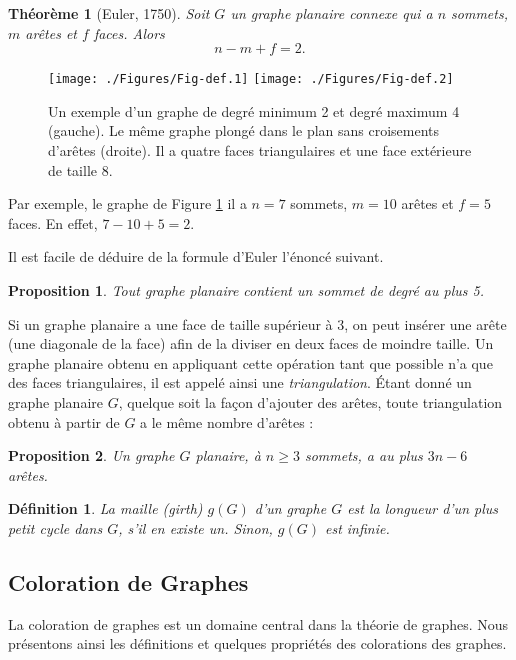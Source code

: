 \documentclass[10pt,a4paper]{article}
\newtheorem{definition}{Définition}
\newtheorem{theorem}{Théorème}
\newtheorem{proposition}{Proposition}
\begin{document}
\begin{theorem}[Euler, 1750]
Soit $G$ un graphe planaire connexe qui a $n$ sommets, $m$ arêtes et $f$ faces. Alors
$$
n - m + f = 2.
$$
\end{theorem}

\begin{figure}[ht]
\centerline{
\texttt{[image: ./Figures/Fig-def.1]}
\hfil
\texttt{[image: ./Figures/Fig-def.2]}
}
\caption{Un exemple d'un graphe de degré minimum 2 et degré maximum 4 (gauche). Le même graphe plongé dans le plan sans croisements d'arêtes (droite). Il a quatre faces triangulaires et une face extérieure de taille 8.}
\label{fig:ex}
\end{figure}

Par exemple, le graphe de Figure \ref{fig:ex} il a $n=7$ sommets, $m=10$ arêtes et $f=5$ faces. En effet, $7 - 10 + 5 = 2$.

Il est facile de déduire de la formule d'Euler l'énoncé suivant.

\begin{proposition}
Tout graphe planaire contient un sommet de degré au plus 5.
\end{proposition}


Si un graphe planaire a une face de taille supérieur à 3, on peut insérer une arête (une diagonale de la face) afin de la diviser en deux faces de moindre taille. Un graphe planaire obtenu en appliquant cette opération tant que possible n'a que des faces triangulaires, il est appelé ainsi une \emph{triangulation}. Étant donné un graphe planaire $G$, quelque soit la façon d'ajouter des arêtes, toute triangulation obtenu à partir de $G$ a le même nombre d'arêtes :

\begin{proposition}
Un graphe $G$ planaire, à $n \geq 3$ sommets, a au plus $3n - 6$ arêtes.
\end{proposition}

\begin{definition}
La \emph{maille (girth)} $g(G)$ d'un graphe $G$ est la longueur d'un plus petit cycle dans $G$, s'il en existe un. Sinon, $g(G)$ est infinie. %
\end{definition}

\subsection{Coloration de Graphes}
La coloration de graphes est un domaine central dans la théorie de graphes. 
Nous présentons ainsi les définitions et quelques propriétés des colorations des graphes.
\end{document}
